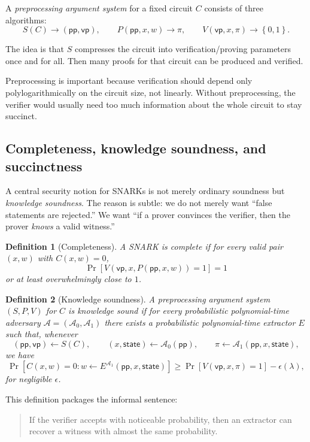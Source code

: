 \documentclass[11pt]{article}
\newcommand{\pp}{\mathsf{pp}}
\newcommand{\vp}{\mathsf{vp}}
\newcommand{\Adv}{\mathcal{A}}
\newcommand{\set}[1]{\left\{#1\right\}}
\newcommand{\paren}[1]{\left(#1\right)}
\newcommand{\bracket}[1]{\left[#1\right]}
\newtheorem{definition}{Definition}
\begin{document}
A \emph{preprocessing argument system} for a fixed circuit $C$ consists of three algorithms:
\[
S(C) \to (\pp,\vp),\qquad P(\pp,x,w) \to \pi,\qquad V(\vp,x,\pi)\to\set{0,1}.
\]

The idea is that $S$ compresses the circuit into verification/proving parameters once and for all. Then many proofs for that circuit can be produced and verified.

Preprocessing is important because verification should depend only polylogarithmically on the circuit size, not linearly. Without preprocessing, the verifier would usually need too much information about the whole circuit to stay succinct.

\subsection{Completeness, knowledge soundness, and succinctness}

A central security notion for SNARKs is not merely ordinary soundness but \emph{knowledge soundness}. The reason is subtle: we do not merely want ``false statements are rejected.'' We want ``if a prover convinces the verifier, then the prover \emph{knows} a valid witness.''

\begin{definition}[Completeness]
A SNARK is complete if for every valid pair $(x,w)$ with $C(x,w)=0$,
\[
\Pr\bracket{V\paren{\vp,x,P(\pp,x,w)}=1}=1
\]
or at least overwhelmingly close to $1$.
\end{definition}

\begin{definition}[Knowledge soundness]
A preprocessing argument system $(S,P,V)$ for $C$ is \emph{knowledge sound} if for every probabilistic polynomial-time adversary $\Adv=(\Adv_0,\Adv_1)$ there exists a probabilistic polynomial-time extractor $E$ such that, whenever
\[
(\pp,\vp)\leftarrow S(C),\qquad (x,\mathsf{state})\leftarrow \Adv_0(\pp),\qquad \pi\leftarrow \Adv_1(\pp,x,\mathsf{state}),
\]
we have
\[
\Pr\bracket{C(x,w)=0: w\leftarrow E^{\Adv_1}(\pp,x,\mathsf{state})}
\ge
\Pr\bracket{V(\vp,x,\pi)=1}-\epsilon(\lambda),
\]
for negligible $\epsilon$.
\end{definition}

This definition packages the informal sentence:
\begin{quote}
If the verifier accepts with noticeable probability, then an extractor can recover a witness with almost the same probability.
\end{quote}
\end{document}
